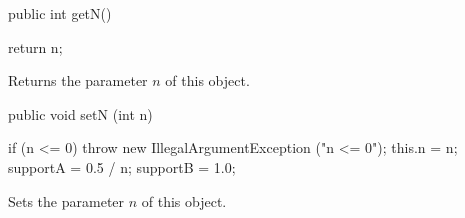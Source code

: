 %
%
\begin{code}

   public int getN()\begin{hide} {
      return n;
   }\end{hide}
\end{code}
 \begin{tabb} Returns the parameter $n$ of this object.
 \end{tabb}
\begin{code}

   public void setN (int n)\begin{hide} {
      if (n <= 0)
         throw new IllegalArgumentException ("n <= 0");
      this.n = n;
      supportA = 0.5 / n;
      supportB = 1.0;
   }\end{hide}
\end{code}
 \begin{tabb} Sets the parameter $n$ of this object.
 \end{tabb}
